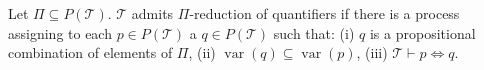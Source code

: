 Let $\Pi \subseteq P(\mathcal{T})$. $\mathcal{T}$ admits $\Pi$-reduction of quantifiers if there is a process assigning to each $p \in P(\mathcal{T})$ a $q \in P(\mathcal{T})$ such that:
(i) $q$ is a propositional combination of elements of $\Pi$,
(ii) $\operatorname{var}(q) \subseteq \operatorname{var}(p)$,
(iii) $\mathcal{T} \vdash p \Leftrightarrow q$.
